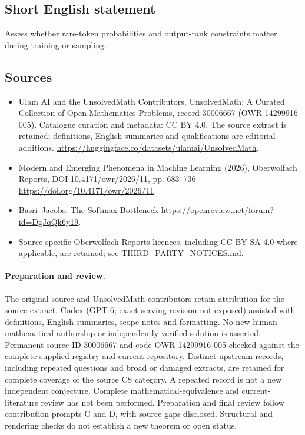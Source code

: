 \documentclass[11pt]{article}
\begin{document}
\subsection{Short English statement}
Assess whether rare-token probabilities and output-rank constraints matter during training or sampling.
\subsection{Sources}
\begin{itemize}
\item[\hypertarget{source:30006667:1}{S1}] Ulam AI and the UnsolvedMath Contributors, UnsolvedMath: A Curated Collection of Open Mathematics Problems, record 30006667 (OWR-14299916-005). Catalogue curation and metadata: CC BY 4.0. The source extract is retained; definitions, English summaries and qualifications are editorial additions.
\url{https://huggingface.co/datasets/ulamai/UnsolvedMath}.
\item[\hypertarget{source:30006667:2}{S2}] Modern and Emerging Phenomena in Machine Learning (2026), Oberwolfach Reports, DOI 10.4171/owr/2026/11, pp. 683--736
\url{https://doi.org/10.4171/owr/2026/11}.
\item[\hypertarget{source:30006667:3}{S3}] Basri--Jacobs, The Softmax Bottleneck
\url{https://openreview.net/forum?id=DgJqQk6y19}.
\item Source-specific Oberwolfach Reports licences, including CC BY-SA 4.0 where applicable, are retained; see THIRD\_PARTY\_NOTICES.md.
\end{itemize}
\paragraph{Preparation and review.}
The original source and UnsolvedMath contributors retain attribution for the source extract. Codex (GPT-6; exact serving revision not exposed) assisted with definitions, English summaries, scope notes and formatting. No new human mathematical authorship or independently verified solution is asserted. Permanent source ID 30006667 and code OWR-14299916-005 checked against the complete supplied registry and current repository. Distinct upstream records, including repeated questions and broad or damaged extracts, are retained for complete coverage of the source CS category. A repeated record is not a new independent conjecture. Complete mathematical-equivalence and current-literature review has not been performed. Preparation and final review follow contribution prompts C and D, with source gaps disclosed. Structural and rendering checks do not establish a new theorem or open status.
\label{end:30006667}
\end{document}
